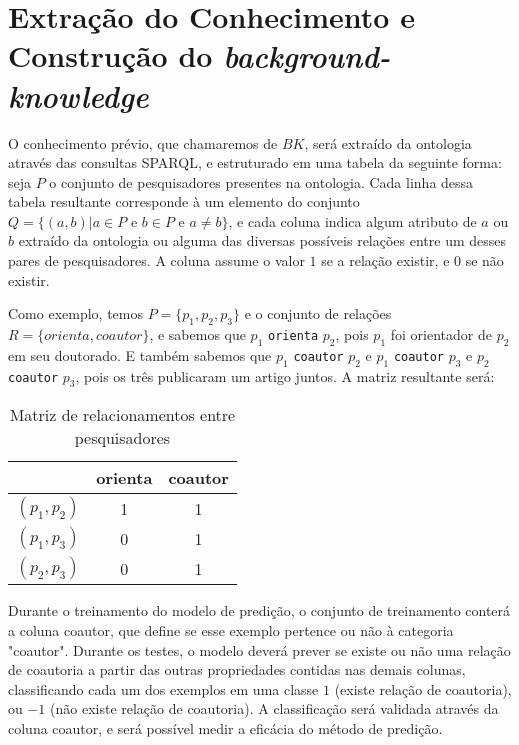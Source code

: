 
\section{Extração do Conhecimento e Construção do \textit{background-knowledge}}
\label{sec:desenvolvimento-background-knowledge}


O conhecimento prévio, que chamaremos de $BK$, será extraído da ontologia através das consultas SPARQL, e estruturado em uma tabela da seguinte forma: seja $P$ o conjunto de pesquisadores presentes na ontologia. Cada linha dessa tabela resultante corresponde à um elemento do conjunto $Q = \{ (a, b) | a \in P \text{ e } b \in P \text{ e } a \neq b \}$, e cada coluna indica algum atributo de $a$ ou $b$ extraído da ontologia ou alguma das diversas possíveis relações entre um desses pares de pesquisadores. A coluna assume o valor $1$ se a relação existir, e $0$ se não existir.

Como exemplo, temos $P = \{ p_1, p_2, p_3 \}$ e o conjunto de relações $R = \{ orienta, coautor \}$, e sabemos que $p_1$ \texttt{orienta} $p_2$, pois $p_1$ foi orientador de $p_2$ em seu doutorado. E também sabemos que $p_1$ \texttt{coautor} $p_2$ e $p_1$ \texttt{coautor} $p_3$ e $p_2$ \texttt{coautor} $p_3$, pois os três publicaram um artigo juntos. A matriz resultante será:

\begin{table}[h!]
    \centering
    \begin{tabular}{|c|c|c|}
     \hline
      & orienta & coautor \\
     \hline\hline
     $(p_1, p_2)$ & 1 & 1  \\
     \hline
     $(p_1, p_3)$ & 0 & 1  \\
     \hline
     $(p_2, p_3)$ & 0 & 1  \\
     \hline
    \end{tabular}
    \caption{Matriz de relacionamentos entre pesquisadores}
    \label{matriz-relacoes}
\end{table}

Durante o treinamento do modelo de predição, o conjunto de treinamento conterá a coluna coautor, que define se esse exemplo pertence ou não à categoria "coautor". Durante os testes, o modelo deverá prever se existe ou não uma relação de coautoria a partir das outras propriedades contidas nas demais colunas, classificando cada um dos exemplos em uma classe $1$ (existe relação de coautoria), ou $-1$ (não existe relação de coautoria). A classificação será validada através da coluna coautor, e será possível medir a eficácia do método de predição.

